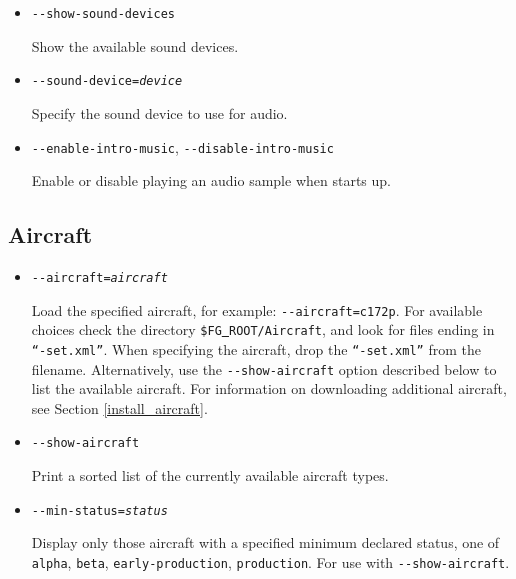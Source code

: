{\begin{itemize}
  Enable or disable sound.

\item{\texttt{-$ $-show-sound-devices}}

  Show the available sound devices.

\item{\texttt{-$ $-sound-device={\it device}}}

  Specify the sound device to use for audio.

\item{\texttt{-$ $-enable-intro-music}, \texttt{-$ $-disable-intro-music}}

  Enable or disable playing an audio sample when \FlightGear{} starts up.

\end{itemize}

\subsection{Aircraft}

\begin{itemize}
\item{\texttt{-$ $-aircraft={\it aircraft}}}

Load the specified aircraft, for example: \texttt{-$ $-aircraft=c172p}. For available choices
check the directory \texttt{\$FG\underline{~}ROOT/Aircraft}, and look for files ending in \texttt{``-set.xml''}.
When specifying the aircraft, drop the \texttt{``-set.xml''} from the filename. Alternatively, use
the \texttt{-$ $-show-aircraft} option described below to list the available aircraft. For information
on downloading additional aircraft, see Section \ref{install_aircraft}.

\item{\texttt{-$ $-show-aircraft}}

Print a sorted list of the currently available aircraft types.

\item{\texttt{-$ $-min-status={\it status}}}

Display only those aircraft with a specified minimum declared status, one of
\texttt{alpha}, \texttt{beta}, \texttt{early-production}, \texttt{production}. For use with \texttt{-$ $-show-aircraft}.


\end{itemize}}
